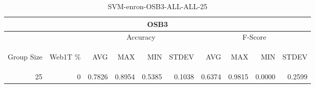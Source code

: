 \begin{center}
\begin{table}[htbp] 
 \begin{center}
\begin{tabular}{ | r | r | r | r | r | r | r | r | r | r |}
\hline
\multicolumn{10}{|c|}{OSB3}\\
\hline
 & & \multicolumn{4}{|c|}{Accuracy} & \multicolumn{4}{|c|}{F-Score}\\ \cline{3-10}
\begin{sideways}Group Size\end{sideways} & \begin{sideways}Web1T \%\end{sideways} & \begin{sideways}AVG\end{sideways} & \begin{sideways}MAX\end{sideways} & \begin{sideways}MIN\end{sideways} & \begin{sideways}STDEV\end{sideways} & \begin{sideways}AVG\end{sideways} & \begin{sideways}MAX\end{sideways} & \begin{sideways}MIN\end{sideways} & \begin{sideways}STDEV\end{sideways}\\
\hline
\multirow{0}{*}{25}
 & 0 & 0.7826 & 0.8954 & 0.5385 & 0.1038 & 0.6374 & 0.9815 & 0.0000 & 0.2599\\ \cline{2-10}
\hline
\end{tabular}
\caption{SVM-enron-OSB3-ALL-ALL-25}
\label{table:SVM-enron-OSB3-ALL-ALL-25}
\end{center}
 \end{table}
\end{center}

